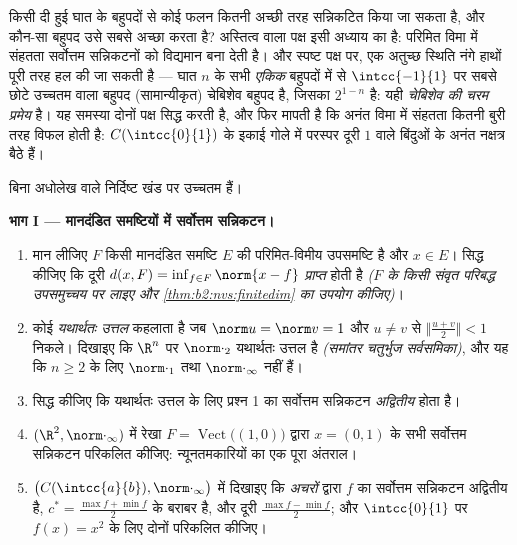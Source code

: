 किसी दी हुई घात के बहुपदों से कोई फलन कितनी अच्छी तरह सन्निकटित किया जा
सकता है, और कौन-सा बहुपद उसे सबसे अच्छा करता है? अस्तित्व वाला पक्ष इसी
अध्याय का है: परिमित विमा में संहतता सर्वोत्तम सन्निकटनों को विद्यमान
बना देती है। और स्पष्ट पक्ष पर, एक अतुच्छ स्थिति नंगे हाथों पूरी तरह हल
की जा सकती है --- घात $n$ के सभी \emph{एकिक} बहुपदों में से $\intcc{-1}{1}$ पर सबसे
छोटे उच्चतम  वाला बहुपद (सामान्यीकृत) चेबिशेव बहुपद है, जिसका
 $2^{1-n}$ है: यही \emph{चेबिशेव की चरम प्रमेय} है। यह समस्या दोनों पक्ष
सिद्ध करती है, और फिर मापती है कि अनंत विमा में संहतता कितनी बुरी तरह
विफल होती है: $C(\intcc{0}{1})$ के इकाई गोले में परस्पर दूरी $1$ वाले बिंदुओं के अनंत
नक्षत्र बैठे हैं।

\begin{problem}
\label{pb:b2:nvs:1}
बिना अधोलेख वाले  निर्दिष्ट खंड पर उच्चतम  हैं।

\medskip
\noindent\textbf{भाग I --- मानदंडित समष्टियों में सर्वोत्तम
सन्निकटन।}
\begin{enumerate}
  \item मान लीजिए $F$ किसी मानदंडित समष्टि $E$ की परिमित-विमीय
        उपसमष्टि है और $x \in E$। सिद्ध कीजिए कि दूरी $d(x,
        F) = \inf_{f \in F}\norm{x - f}$ \emph{प्राप्त}
        होती है \emph{($F$ के किसी संवृत परिबद्ध उपसमुच्चय पर लाइए और
        \cref{thm:b2:nvs:finitedim} का उपयोग कीजिए)}।
  \item कोई  \emph{यथार्थतः उत्तल} कहलाता है जब $\norm u = \norm v
        = 1$ और $u \neq v$ से
        $\bigl\Vert\frac{u +
        v}2\bigr\Vert < 1$ निकले। दिखाइए कि $\R^n$ पर $\norm\cdot_2$ यथार्थतः उत्तल है
        \emph{(समांतर चतुर्भुज सर्वसमिका)}, और यह कि $n \geq 2$ के लिए $\norm\cdot_1$
        तथा $\norm\cdot_\infty$ नहीं हैं।
  \item सिद्ध कीजिए कि यथार्थतः उत्तल  के लिए प्रश्न 1 का
        सर्वोत्तम सन्निकटन \emph{अद्वितीय} होता है।
  \item $(\R^2, \norm\cdot_\infty)$ में रेखा $F =
        \operatorname{Vect}\bigl((1,0)\bigr)$ द्वारा $x = (0, 1)$ के सभी सर्वोत्तम सन्निकटन
        परिकलित कीजिए: न्यूनतमकारियों का एक पूरा अंतराल।
  \item $\bigl(C(\intcc{a}{b}), \norm\cdot_\infty\bigr)$ में दिखाइए कि \emph{अचरों} द्वारा $f$ का सर्वोत्तम
        सन्निकटन अद्वितीय है, $c^* = \frac{\max f
        + \min f}{2}$ के बराबर है, और दूरी $\frac{\max f - \min
        f}{2}$; और $\intcc{0}{1}$
        पर $f(x) = x^2$ के लिए दोनों परिकलित कीजिए।
\end{enumerate}


\end{problem}
